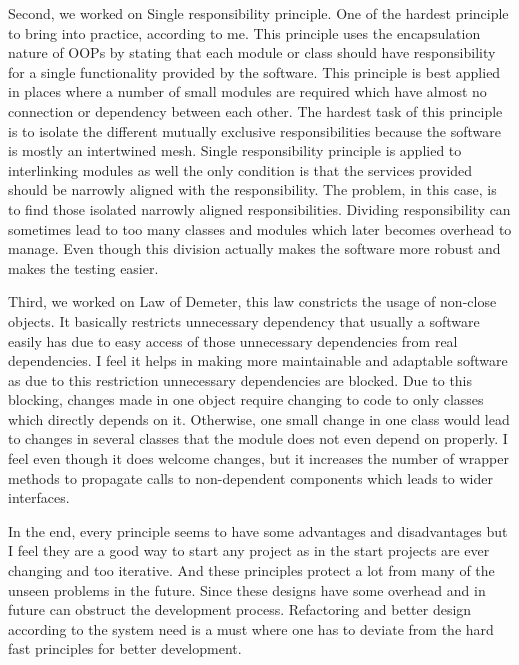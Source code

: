 Second, we worked on Single responsibility principle. One of the hardest principle to bring into practice, according to me. This principle uses the encapsulation nature of OOPs by stating that each module or class should have responsibility for a single functionality provided by the software. This principle is best applied in places where a number of small modules are required which have almost no connection or dependency between each other. The hardest task of this principle is to isolate the different mutually exclusive responsibilities because the software is mostly an intertwined mesh. Single responsibility principle is applied to interlinking modules as well the only condition is that the services provided should be narrowly aligned with the responsibility. The problem, in this case, is to find those isolated narrowly aligned responsibilities. Dividing responsibility can sometimes lead to too many classes and modules which later becomes overhead to manage. Even though this division actually makes the software more robust and makes the testing easier.

Third, we worked on Law of Demeter, this law constricts the usage of non-close objects. It basically restricts unnecessary dependency that usually a software easily has due to easy access of those unnecessary dependencies from real dependencies. I feel it helps in making more maintainable and adaptable software as due to this restriction unnecessary dependencies are blocked. Due to this blocking, changes made in one object require changing to code to only classes which directly depends on it. Otherwise, one small change in one class would lead to changes in several classes that the module does not even depend on properly. I feel even though it does welcome changes, but it increases the number of wrapper methods to propagate calls to non-dependent components which leads to wider interfaces.

In the end, every principle seems to have some advantages and disadvantages but I feel they are a good way to start any project as in the start projects are ever changing and too iterative. And these principles protect a lot from many of the unseen problems in the future. Since these designs have some overhead and in future can obstruct the development process. Refactoring and better design according to the system need is a must where one has to deviate from the hard fast principles for better development.